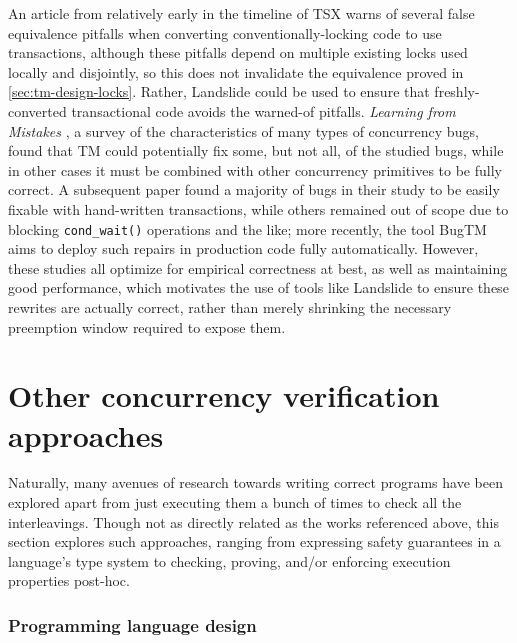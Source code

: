 An article from relatively early in the timeline of TSX \cite{htm-subtleties}
warns of several false equivalence pitfalls when converting conventionally-locking code to use transactions,
although these pitfalls depend on multiple existing locks used locally and disjointly,
so this does not invalidate the equivalence proved in \cref{sec:tm-design-locks}.
Rather, Landslide could be used to ensure that freshly-converted transactional code avoids the warned-of pitfalls.
{\em Learning from Mistakes} \cite{learning-from-mistakes},
a survey of the characteristics of many types of concurrency bugs,
found that TM could potentially fix some, but not all, of the studied bugs,
while in other cases it must be combined with other concurrency primitives to be fully correct.
A subsequent paper \cite{applying-tm-bugs}
found a majority of bugs in their study to be easily fixable with hand-written transactions,
while others remained out of scope due to blocking {\tt cond\_wait()} operations and the like;
more recently, the tool BugTM \cite{bugtm} aims to deploy such repairs in production code fully automatically.
However, these studies all optimize for empirical correctness at best,
as well as maintaining good performance,
which motivates the use of tools like Landslide to ensure these rewrites
are actually correct,
rather than merely shrinking the necessary preemption window required to expose them.


\section{Other concurrency verification approaches}

Naturally, many avenues of research towards writing correct programs
have been explored
apart from just executing them a bunch of times to check all the interleavings.
Though not as directly related as the works referenced above,
this section explores such approaches,
ranging from expressing safety guarantees in a language's type system
to checking, proving, and/or enforcing execution properties post-hoc.

\subsubsection{Programming language design}


